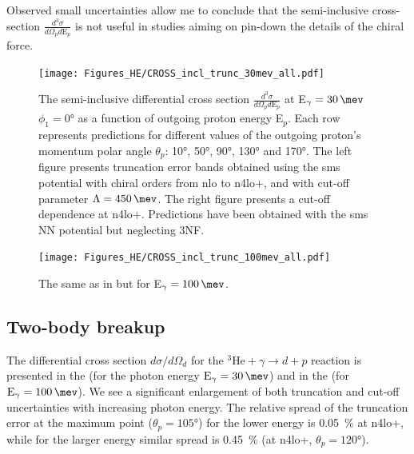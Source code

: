         Observed small uncertainties allow me to conclude that the semi-inclusive cross-section
        $\frac{d^3\sigma}{d\Omega_p d\text{E}_p}$ is not useful in studies aiming on
        pin-down the details of the chiral force.



        \begin{figure}[h]
            \begin{center}
            \texttt{[image: Figures\_HE/CROSS\_incl\_trunc\_30mev\_all.pdf]}
            \end{center}
            \caption{The semi-inclusive differential cross section $\frac{d^3\sigma}{d\Omega_p d\text{E}_p}$
            at E$_\gamma = \SI{30}{\mev}$ $\phi_1 = \ang{0}$ as a function of outgoing proton energy E$_p$. Each row represents 
            predictions for different values of the outgoing proton's momentum polar angle $\theta_p$: 
            \ang{10}, \ang{50}, \ang{90}, \ang{130} and \ang{170}.
            The left figure presents truncation error bands obtained using the \gls{sms} potential
            with chiral orders from \gls{nlo} to \gls{n4lo+}, and with
            cut-off parameter $\Lambda=\SI{450}{\mev}$.
            The right figure presents a cut-off dependence at \gls{n4lo+}.
            Predictions have been obtained with the \gls{sms} NN potential but neglecting 3NF.}
            \label{CROSS_HE_INCL_30MEV_2NF}
        \end{figure}

        \begin{figure}[h]
            \begin{center}
            \texttt{[image: Figures\_HE/CROSS\_incl\_trunc\_100mev\_all.pdf]}
            \end{center}
            \caption{The same as in  but for E$_\gamma = \SI{100}{\mev}$.}
            \label{CROSS_HE_INCL_100MEV_2NF}
        \end{figure}


\clearpage


\subsection{Two-body breakup}

    The differential cross section $d\sigma/d\Omega_d$ for the $^3\text{He} + \gamma \rightarrow d + p$ reaction
    is presented in the  (for the photon energy $\text{E}_\gamma = \SI{30}{\mev}$)
    and in the  (for $\text{E}_\gamma = \SI{100}{\mev}$).
    We see a significant enlargement of both truncation and cut-off uncertainties
    with increasing photon energy.
    The relative spread of the truncation error at the maximum point ($\theta_p = \ang{105}$)
    for the lower energy is \SI{0.05}{\percent} at \gls{n4lo+}, while for the larger energy
    similar spread is \SI{0.45}{\percent} (at \gls{n4lo+}, $\theta_p = \ang{120}$).


